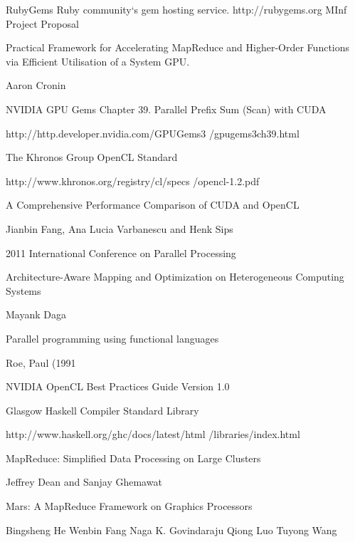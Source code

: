 \documentclass[13pt,a4paper,twocolumn] {scrartcl}   %
\begin{document}
\begin{thebibliography}{9}

\thispagestyle{empty}
\pagestyle{empty}
  RubyGems
  Ruby community`s gem hosting service.
  http://rubygems.org
    MInf Project Proposal

    Practical Framework for Accelerating MapReduce and Higher-Order Functions via Efficient Utilisation of a System GPU.

    Aaron Cronin

    NVIDIA GPU Gems
    Chapter 39. Parallel Prefix Sum (Scan) with CUDA

    http://http.developer.nvidia.com/GPUGems3
    /gpugems\textunderscore3ch39.html

    The Khronos Group OpenCL Standard

    http://www.khronos.org/registry/cl/specs
    /opencl-1.2.pdf

    A Comprehensive Performance Comparison of
    CUDA and OpenCL

    Jianbin Fang, Ana Lucia Varbanescu and Henk Sips

    2011 International Conference on Parallel Processing

    Architecture-Aware Mapping and Optimization on Heterogeneous Computing Systems

    Mayank Daga

    Parallel programming using functional languages

    Roe, Paul (1991

    NVIDIA OpenCL Best Practices Guide Version 1.0

    Glasgow Haskell Compiler Standard Library

    http://www.haskell.org/ghc/docs/latest/html
    /libraries/index.html

    MapReduce: Simplified Data Processing on Large Clusters

    Jeffrey Dean and Sanjay Ghemawat

  Mars: A MapReduce Framework on Graphics Processors

  Bingsheng He Wenbin Fang Naga K. Govindaraju Qiong Luo Tuyong Wang

\thispagestyle{empty}
\pagestyle{empty}
\end{thebibliography}
\end{document}
